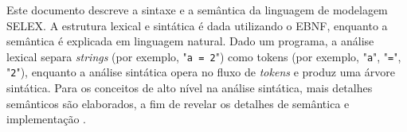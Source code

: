 \label{an:selex_appendix}

Este documento descreve a sintaxe e a semântica da linguagem de modelagem \gls{SELEX}. A estrutura lexical e sintática é dada utilizando o \gls{EBNF}, enquanto a semântica é explicada em linguagem natural. Dado um programa, a análise lexical separa \textit{strings} (por exemplo, "\texttt{a = 2}") como tokens (por exemplo, "\texttt{a}", "\texttt{=}", "\texttt{2}"), enquanto a análise sintática opera no fluxo de \textit{tokens} e produz uma árvore sintática. Para os conceitos de alto nível na análise sintática, mais detalhes semânticos são elaborados, a fim de revelar os detalhes de semântica e implementação \cite{wonka2018}.

